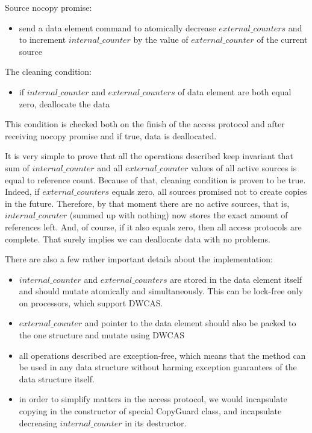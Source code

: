 \documentclass{article}
\begin{document}
Source nocopy promise:
\begin{itemize}
	\item send a data element command to atomically decrease $external\_counters$ and to increment $internal\_counter$ by the value of $external\_counter$ of the current source
\end{itemize}

The cleaning condition:
\begin{itemize}
	\item if  $internal\_counter$ and $external\_counters$ of data element are both equal zero, deallocate the data
\end{itemize}

This condition is checked both on the finish of the access protocol and after receiving nocopy promise and if true, data is deallocated.

It is very simple to prove that all the operations described keep invariant that sum of $internal\_counter$ and all $external\_counter$ values of all active sources is equal to reference count. Because of that, cleaning condition is proven to be true. Indeed, if $external\_counters$ equals zero, all sources promised not to create copies in the future. Therefore, by that moment there are no active sources, that is, $internal\_counter$ (summed up with nothing) now stores the exact amount of references left. And, of course, if it also equals zero, then all access protocols are complete. That surely implies we can deallocate data with no problems.

There are also a few rather important details about the implementation:
\begin{itemize}
	\item $internal\_counter$ and $external\_counters$ are stored in the data element itself and should mutate atomically and simultaneously. This can be lock-free only on processors, which support DWCAS.
	\item $external\_counter$ and pointer to the data element should also be packed to the one structure and mutate using DWCAS
	\item all operations described are exception-free, which means that the method can be used in any data structure without harming exception guarantees of the data structure itself.
	\item in order to simplify matters in the access protocol, we would incapsulate copying in the constructor of special CopyGuard class, and incapsulate decreasing $internal\_counter$ in its destructor.
\end{itemize}
\end{document}

